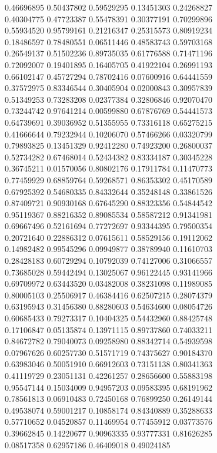 \begin{figure}
   0.46696895   0.50437802
   0.59529295   0.13451303
   0.24268827   0.40304775
   0.47723387   0.55478391
   0.30377191   0.70299896
   0.55934520   0.95799161
   0.21216347   0.25315573
   0.80919234   0.18486597
   0.78480551   0.06511446
   0.48583743   0.59703168
   0.26549137   0.51502236
   0.89735035   0.61776588
   0.71471196   0.72092007
   0.19401895   0.16405705
   0.41922104   0.26991193
   0.66102147   0.45727294
   0.78702416   0.07600916
   0.64441559   0.37572975
   0.83346544   0.30405904
   0.02000843   0.30957839
   0.51349253   0.73283208
   0.02377384   0.32806846
   0.92070470   0.73244742
   0.97641214   0.00599880
   0.67876769   0.54441573
   0.64739691   0.39036952
   0.51355955   0.73316118
   0.65275215   0.41666644
   0.79232944   0.10206070
   0.57466266   0.03320799
   0.79893825   0.13451329
   0.92412280   0.74923200
   0.26800037   0.52734282
   0.67468014   0.52434382
   0.83334187   0.30345228
   0.36745211   0.01570056
   0.80802176   0.17911784
   0.11470773   0.77459929
   0.68859764   0.59268571
   0.86353302   0.45170589
   0.67925392   0.54680335
   0.84332644   0.35248148
   0.33861526   0.87409721
   0.90930168   0.67645290
   0.88323356   0.54844542
   0.95119367   0.88216352
   0.89085534   0.58587212
   0.91341981   0.69667496
   0.52161694   0.77272697
   0.93344395   0.79500354
   0.20721640   0.22886312
   0.07615611   0.58529156
   0.19112062   0.14982482
   0.99545296   0.09949877
   0.38789940   0.11610703
   0.28428183   0.60729294
   0.10792039   0.74127006
   0.31066557   0.73685028
   0.59442494   0.13025067
   0.96122445   0.93141966
   0.69709972   0.63443520
   0.03482008   0.38231098
   0.11989085   0.80005103
   0.25506917   0.46384416
   0.62507215   0.28074379
   0.63195943   0.31456380
   0.88280603   0.54634600
   0.08054726   0.60685433
   0.79273317   0.10404325
   0.54432960   0.88425748
   0.17106847   0.05135874
   0.13971115   0.89737860
   0.74033211   0.84672782
   0.79040073   0.09258980
   0.88342714   0.54939598
   0.07967626   0.60257730
   0.51571719   0.74375627
   0.90184370   0.63983046
   0.50051910   0.66912603
   0.73151138   0.80341363
   0.41119729   0.23051131
   0.42261257   0.28656600
   0.55883198   0.95547144
   0.15034009   0.94957203
   0.09583395   0.68191962
   0.78561813   0.06910483
   0.72450168   0.76899250
   0.26149144   0.49538074
   0.59001217   0.10858174
   0.84340889   0.35288633
   0.57710652   0.04520857
   0.11469954   0.77455912
   0.03773576   0.39662845
   0.14220677   0.90963335
   0.93777331   0.81626285
   0.08517358   0.62957186
   0.46409018   0.49024185

\end{figure}
